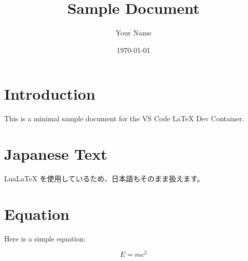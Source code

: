 \documentclass[a4paper,11pt]{article}
\title{Sample Document}
\author{Your Name}
\date{\today}
\begin{document}
\maketitle

\section{Introduction}

This is a minimal sample document for the VS Code LaTeX Dev Container.

\section{Japanese Text}

LuaLaTeX を使用しているため、日本語もそのまま扱えます。

\section{Equation}

Here is a simple equation:

\[
  E = mc^2
\]
\end{document}

